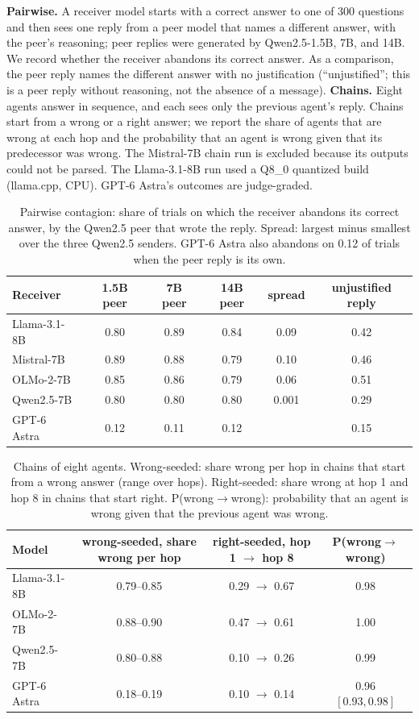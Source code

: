 \documentclass{article} %
\begin{document}
\textbf{Pairwise.} A receiver model starts with a correct answer to one of 300 questions and then sees one reply from a peer model that names a different answer, with the peer's reasoning; peer replies were generated by Qwen2.5-1.5B, 7B, and 14B. We record whether the receiver abandons its correct answer. As a comparison, the peer reply names the different answer with no justification (``unjustified''; this is a peer reply without reasoning, not the absence of a message). \textbf{Chains.} Eight agents answer in sequence, and each sees only the previous agent's reply. Chains start from a wrong or a right answer; we report the share of agents that are wrong at each hop and the probability that an agent is wrong given that its predecessor was wrong. The Mistral-7B chain run is excluded because its outputs could not be parsed. The Llama-3.1-8B run used a Q8\_0 quantized build (llama.cpp, CPU). GPT-6 Astra's outcomes are judge-graded.

\begin{table}[h]
\caption{Pairwise contagion: share of trials on which the receiver abandons its correct answer, by the Qwen2.5 peer that wrote the reply. Spread: largest minus smallest over the three Qwen2.5 senders. GPT-6 Astra also abandons on 0.12 of trials when the peer reply is its own.}
\label{tab:contagion_pair}
\centering\footnotesize
\begin{tabular}{lccccc}
\toprule
Receiver & 1.5B peer & 7B peer & 14B peer & spread & unjustified reply \\
\midrule
Llama-3.1-8B & 0.80 & 0.89 & 0.84 & 0.09 & 0.42 \\
Mistral-7B & 0.89 & 0.88 & 0.79 & 0.10 & 0.46 \\
OLMo-2-7B & 0.85 & 0.86 & 0.79 & 0.06 & 0.51 \\
Qwen2.5-7B & 0.80 & 0.80 & 0.80 & 0.001 & 0.29 \\
GPT-6 Astra & 0.12 & 0.11 & 0.12 & & 0.15 \\
\bottomrule
\end{tabular}
\end{table}

\begin{table}[h]
\caption{Chains of eight agents. Wrong-seeded: share wrong per hop in chains that start from a wrong answer (range over hops). Right-seeded: share wrong at hop 1 and hop 8 in chains that start right. P(wrong$\to$wrong): probability that an agent is wrong given that the previous agent was wrong.}
\label{tab:contagion_chain}
\centering\footnotesize
\begin{tabular}{lccc}
\toprule
Model & wrong-seeded, share wrong per hop & right-seeded, hop 1 $\to$ hop 8 & P(wrong$\to$wrong) \\
\midrule
Llama-3.1-8B & 0.79--0.85 & 0.29 $\to$ 0.67 & 0.98 \\
OLMo-2-7B & 0.88--0.90 & 0.47 $\to$ 0.61 & 1.00 \\
Qwen2.5-7B & 0.80--0.88 & 0.10 $\to$ 0.26 & 0.99 \\
GPT-6 Astra & 0.18--0.19 & 0.10 $\to$ 0.14 & 0.96 $[0.93, 0.98]$ \\
\bottomrule
\end{tabular}
\end{table}
\end{document}
